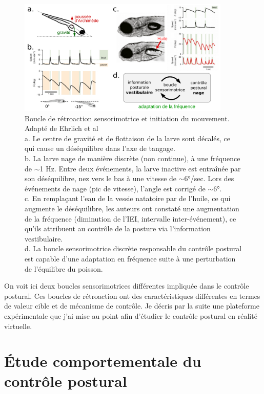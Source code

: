\begin{figure}
\centering
\includegraphics[width=0.9\textwidth]{./files/schoppik_movement-initiation.svg.png}
\caption{Boucle de rétroaction sensorimotrice et initiation du mouvement. Adapté de Ehrlich et al \cite{ehrlich_control_2017}
\\ a. Le centre de gravité et de flottaison de la larve sont décalés, ce qui cause un déséquilibre dans l'axe de tangage.
\\ b. La larve nage de manière discrète (non continue), à une fréquence de $\sim$1 Hz. Entre deux événements, la larve inactive est entraînée par son déséquilibre, nez vers le bas à une vitesse de $\sim$6°/sec. Lors des événements de nage (pic de vitesse), l'angle est corrigé de $\sim$6°.
\\ c. En remplaçant l'eau de la vessie natatoire par de l'huile, ce qui augmente le déséquilibre, les auteurs ont constaté une augmentation de la fréquence (diminution de l'IEI, intervalle inter-événement), ce qu'ils attribuent au contrôle de la posture via l'information vestibulaire.
\\ d. La boucle sensorimotrice discrète responsable du contrôle postural est capable d'une adaptation en fréquence suite à une perturbation de l'équilibre du poisson.}
\end{figure}

On voit ici deux boucles sensorimotrices différentes impliquée dans le contrôle postural. Ces boucles de rétroaction ont des caractéristiques différentes en termes de valeur cible et de mécanisme de contrôle. Je décris par la suite une plateforme expérimentale que j'ai mise au point afin d'étudier le contrôle postural en réalité virtuelle.

\section{Étude comportementale du contrôle postural}

